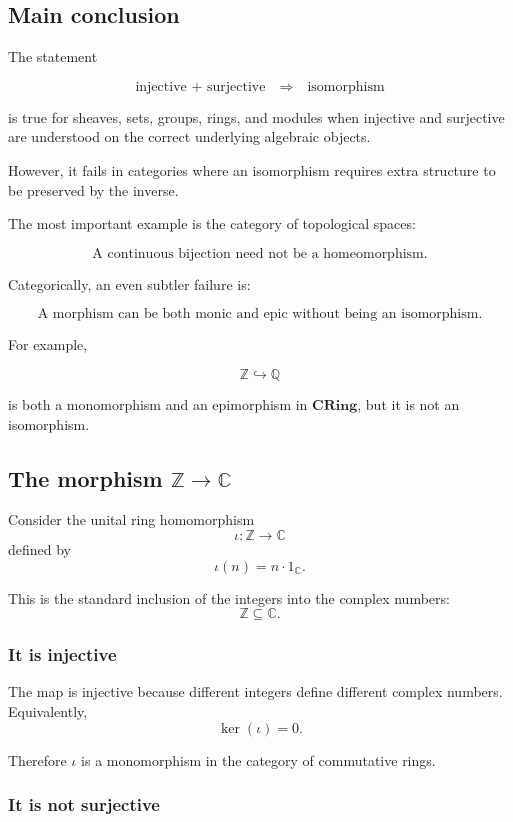 \documentclass[12pt,a4paper]{article}
\theoremstyle{notespace}
\begin{document}
\subsection{Main conclusion}

The statement

\[
\text{injective + surjective}
\quad\Longrightarrow\quad
\text{isomorphism}
\]

is true for sheaves, sets, groups, rings, and modules when injective and surjective are understood on the correct underlying algebraic objects.

However, it fails in categories where an isomorphism requires extra structure to be preserved by the inverse.

The most important example is the category of topological spaces:

\[
\boxed{
	\text{A continuous bijection need not be a homeomorphism.}
}
\]

Categorically, an even subtler failure is:

\[
\boxed{
	\text{A morphism can be both monic and epic without being an isomorphism.}
}
\]

For example,

\[
\boxed{
	\mathbb Z\hookrightarrow \mathbb Q
}
\]

is both a monomorphism and an epimorphism in \(\mathbf{CRing}\), but it is not an isomorphism.

\subsection{The morphism \texorpdfstring{\(\mathbb Z\to \mathbb C\)}{Z to C}}

Consider the unital ring homomorphism
\[
\iota:\mathbb Z\longrightarrow \mathbb C
\]
defined by
\[
\iota(n)=n\cdot 1_{\mathbb C}.
\]

This is the standard inclusion of the integers into the complex numbers:
\[
\mathbb Z\subseteq \mathbb C.
\]

\subsubsection*{It is injective}

The map is injective because different integers define different complex numbers. Equivalently,
\[
\ker(\iota)=0.
\]

Therefore \(\iota\) is a monomorphism in the category of commutative rings.

\subsubsection*{It is not surjective}
\end{document}

